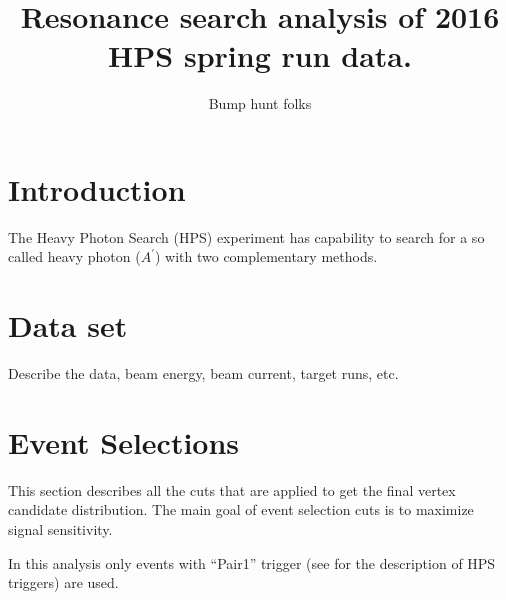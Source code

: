 \documentclass[letterpaper,12pt]{article}
\author{Bump hunt folks}
\title{Resonance search analysis of 2016 HPS spring run data.}
\begin{document}
\maketitle

\tableofcontents
\newpage

\section*{Introduction}

The Heavy Photon Search (HPS) experiment has capability to search for a so called heavy photon ($A^{\prime}$) with two complementary methods.


\section{Data set}
Describe the data, beam energy, beam current, target runs, etc.

\section{Event Selections}
This section describes all the cuts that are applied to get the final vertex candidate distribution. 
The main goal of event selection cuts is to maximize signal sensitivity.

In this analysis only events with ``Pair1'' trigger (see \cite{TriggerNote} for the description of HPS triggers) are used.
\end{document}
